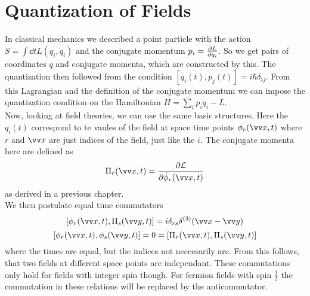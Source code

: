 \chapter{Quantization of Fields}

In classical mechanics we described a point particle with the action $S = \int \dd t L(q_i, \dot{q}_i)$ and the conjugate momentum $p_i = \frac{\partial L}{\partial \dot{q}_i}$. So we get pairs of coordinates $q$ and conjugate momenta, which are constructed by this. The quantization then followed from the condition $[q_i(t), p_j(t)] = i \hbar \delta_{ij}$. From this Lagrangian and the definition of the conjugate momentum we can impose the quantization condition on the Hamiltonian $H = \sum_i p_i \dot{q}_i - L$.\\
Now, looking at field theories, we can use the same basic structures. Here the $q_i(t)$ correspond to te vaules of the field at space time points $\phi_r(\vx,t)$ where $r$ and $\vx$ are just indices of the field, just like the $i$. The conjugate momenta here are defined as 
\[ \Pi_r(\vx, t) = \frac{\p \LL}{\p \dot{\phi}_r(\vx,t)}\]
as derived in a previous chapter.\\
We then postulate equal time commutators
\[ [\phi_r(\vx, t) , \Pi_s(\vy, t) ] = i \delta_{rs} \delta^{(3)}(\vx - \vy)\]
\[ [ \phi_r(\vx, t) , \phi_s( \vy, t) ] = 0 = [ \Pi_r(\vx, t), \Pi_s(\vy,t)]\]
where the times are equal, but the indices not neccesarily are. From this follows, that two fields at different space points are independant. These commutations only hold for fields with integer spin though. For fermion fields with spin $\frac{1}{2}$ the commutation in these relations will be replaced by the anticommutator.
